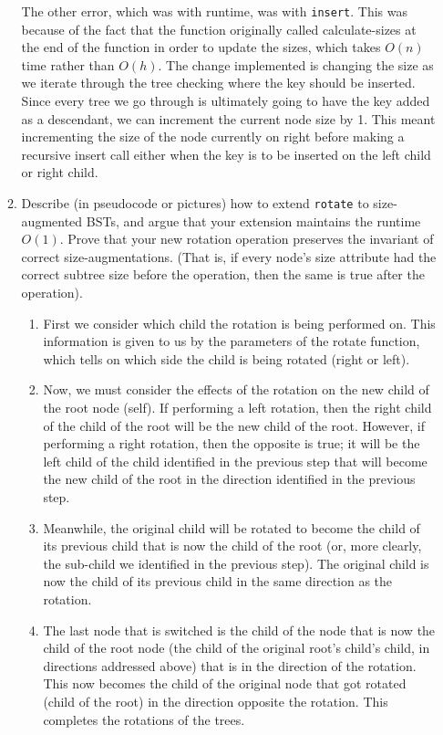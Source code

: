 \documentclass[11pt]{article}
\begin{document}
\begin{enumerate}
\begin{enumerate}
        The other error, which was with runtime, was with \texttt{insert}. This was because of the fact that the function originally called calculate-sizes at the end of the function in order to update the sizes, which takes $O(n)$ time rather than $O(h)$. The change implemented is changing the size as we iterate through the tree checking where the key should be inserted. Since every tree we go through is ultimately going to have the key added as a descendant, we can increment the current node size by 1. This meant incrementing the size of the node currently on right before making a recursive insert call either when the key is to be inserted on the left child or right child. 
        
        
        \item Describe (in pseudocode or pictures) how to extend \texttt{rotate} to size-augmented BSTs, and argue that your extension maintains the runtime $O(1)$. Prove that your new rotation operation preserves the invariant of correct size-augmentations. (That is, if every node's size attribute had the correct subtree size before the operation, then the same is true after the operation). 
        
        \begin{enumerate}
            \item First we consider which child the rotation is being performed on. This information is given to us by the parameters of the rotate function, which tells on which side the child is being rotated (right or left). 
            \item Now, we must consider the effects of the rotation on the new child of the root node (self). If performing a left rotation, then the right child of the child of the root will be the new child of the root. However, if performing a right rotation, then the opposite is true; it will be the left child of the child identified in the previous step that will become the new child of the root in the direction identified in the previous step. 
            \item Meanwhile, the original child will be rotated to become the child of its previous child that is now the child of the root (or, more clearly, the sub-child we identified in the previous step). The original child is now the child of its previous child in the same direction as the rotation. 
            \item The last node that is switched is the child of the node that is now the child of the root node (the child of the original root's child's child, in directions addressed above) that is in the direction of the rotation. This now becomes the child of the original node that got rotated (child of the root) in the direction opposite the rotation. This completes the rotations of the trees. \\
            

\end{enumerate}
\end{enumerate}
\end{enumerate}
\end{document}
